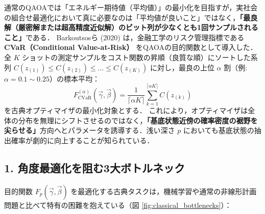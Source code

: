 \documentclass[11pt,a4paper,oneside,openany]{ltjsbook}
\theoremstyle{definition}
\theoremstyle{plain}
\theoremstyle{remark}
\begin{document}
\begin{insightbox}
通常のQAOAでは「エネルギー期待値（平均値）」の最小化を目指すが，実社会の組合せ最適化において真に必要なのは「平均値が良いこと」ではなく，\textbf{「最良解（厳密解または超高精度近似解）のビット列が少なくとも1回サンプルされること」}である．
Barkoutsosら (2020)\cite{barkoutsos2020improving} は，金融工学のリスク管理指標である \textbf{CVaR（Conditional Value-at-Risk）} をQAOAの目的関数として導入した．
全 $K$ ショットの測定サンプルをコスト関数の昇順（良質な順）にソートした系列 $C(z_{(1)}) \le C(z_{(2)}) \le \dots \le C(z_{(K)})$ に対し，最良の上位 $\alpha$ 割（例: $\alpha = 0.1 \sim 0.25$）の標本平均：
\begin{equation}
    F_{\text{CVaR}}^{(\alpha)}(\vec{\gamma}, \vec{\beta}) = \frac{1}{\lceil \alpha K \rceil} \sum_{k=1}^{\lceil \alpha K \rceil} C(z_{(k)})
\end{equation}
を古典オプティマイザの最小化対象とする．
これにより，オプティマイザは全体の分布を無理にシフトさせるのではなく，\textbf{「基底状態近傍の確率密度の裾野を尖らせる」}方向へとパラメータを誘導する．浅い深さ $p$ においても基底状態の抽出確率が劇的に向上することが知られている．
\end{insightbox}

\subsection{1. 角度最適化を阻む3大ボトルネック}
目的関数 $F_p(\vec{\gamma}, \vec{\beta})$ を最適化する古典タスクは，機械学習や通常の非線形計画問題と比べて特有の困難を抱えている（図 \ref{fig:classical_bottlenecks}）：
\end{document}
